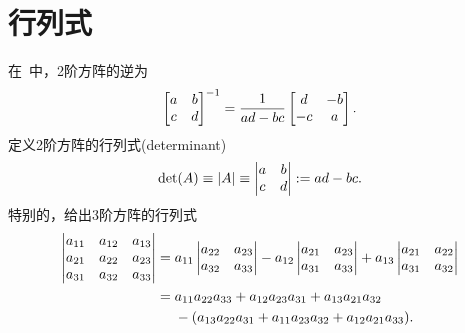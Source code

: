 \chapter{行列式}
在~中，2阶方阵的逆为
\begin{align*}
	\begin{bmatrix}
		a&b\\c&d
	\end{bmatrix}^{-1}=\frac1{ad-bc}
	\begin{bmatrix}
		d&-b\\
		-c&a
	\end{bmatrix}.
\end{align*}
定义2阶方阵的行列式(determinant)
\begin{align}
	\det (A)\equiv\left\lvert A\right\rvert\equiv\begin{vmatrix}
		a&b\\c&d
	\end{vmatrix}:=ad-bc.
\end{align}
特别的，给出3阶方阵的行列式
\begin{align}
	\begin{vmatrix}
		a_{11}&a_{12}&a_{13}\\
		a_{21}&a_{22}&a_{23}\\
		a_{31}&a_{32}&a_{33}
	\end{vmatrix}={}&a_{11}
	\begin{vmatrix}
		a_{22}&a_{23}\\
		a_{32}&a_{33}
	\end{vmatrix}-a_{12}
	\begin{vmatrix}
		a_{21}&a_{23}\\
		a_{31}&a_{33}
	\end{vmatrix}+a_{13}
	\begin{vmatrix}
		a_{21}&a_{22}\\
		a_{31}&a_{32}
	\end{vmatrix}\\\notag
	={}&a_{11}a_{22}a_{33}+a_{12}a_{23}a_{31}+a_{13}a_{21}a_{32}\\\notag
	&-(a_{13}a_{22}a_{31}+a_{11}a_{23}a_{32}+a_{12}a_{21}a_{33}).
\end{align}
